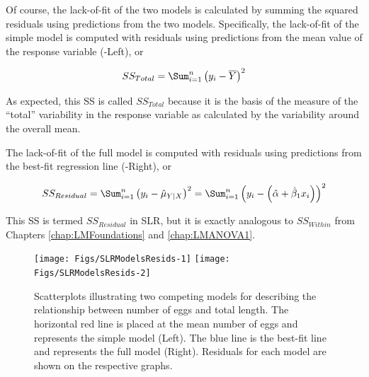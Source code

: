 \documentclass[10pt,openany]{book}\usepackage[]{graphicx}\usepackage[]{color}
\newenvironment{knitrout}{}{} %
\begin{document}

Of course, the lack-of-fit of the two models is calculated by summing the squared residuals using predictions from the two models.  Specifically, the lack-of-fit of the simple model is computed with residuals using predictions from the mean value of the response variable (-Left), or

\begin{equation}\label{eqn:SLRsimpleRSS}
  SS_{Total} = \Sum_{i=1}^{n}\left(y_{i}-\overline{Y}\right)^{2}
\end{equation}

As expected, this SS is called $SS_{Total}$ because it is the basis of the measure of the ``total'' variability in the response variable as calculated by the variability around the overall mean.

The lack-of-fit of the full model is computed with residuals using predictions from the best-fit regression line (-Right), or

\[ SS_{Residual} = \Sum_{i=1}^{n}\left(y_{i}-\hat{\mu}_{Y|X}\right)^{2} = \Sum_{i=1}^{n}\left(y_{i}-\left(\hat{\alpha}+\hat{\beta}_{1}x_{i}\right)\right)^{2} \]

This SS is termed $SS_{Residual}$ in SLR, but it is exactly analogous to $SS_{Within}$ from Chapters \ref{chap:LMFoundations} and \ref{chap:LMANOVA1}.

\begin{knitrout}
\color{fgcolor}\begin{figure}[h]

{\centering \texttt{[image: Figs/SLRModelsResids-1]} 
\texttt{[image: Figs/SLRModelsResids-2]} 

}

\caption[Scatterplots illustrating two competing models for describing the relationship between number of eggs and total length]{Scatterplots illustrating two competing models for describing the relationship between number of eggs and total length.  The horizontal red line is placed at the mean number of eggs and represents the simple model (Left).  The blue line is the best-fit line and represents the full model (Right).  Residuals for each model are shown on the respective graphs.}\label{fig:SLRModelsResids}
\end{figure}


\end{knitrout}
\end{document}
